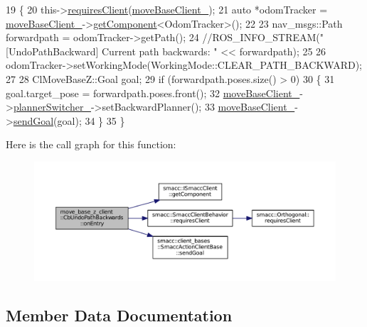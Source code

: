 \begin{DoxyCode}
19   \{
20     this->\hyperlink{classsmacc_1_1SmaccClientBehavior_a917f001e763a1059af337bf4e164f542}{requiresClient}(\hyperlink{classmove__base__z__client_1_1CbUndoPathBackwards_a19e7ace85698725a1d2730a7c6b3aa7d}{moveBaseClient\_});
21     \textcolor{keyword}{auto} *odomTracker = \hyperlink{classmove__base__z__client_1_1CbUndoPathBackwards_a19e7ace85698725a1d2730a7c6b3aa7d}{moveBaseClient\_}->\hyperlink{classsmacc_1_1ISmaccClient_adef78db601749ca63c19e74a27cb88cc}{getComponent}<OdomTracker>();
22 
23     nav\_msgs::Path forwardpath = odomTracker->getPath();
24     \textcolor{comment}{//ROS\_INFO\_STREAM("[UndoPathBackward] Current path backwards: " << forwardpath);}
25 
26     odomTracker->setWorkingMode(WorkingMode::CLEAR\_PATH\_BACKWARD);
27 
28     ClMoveBaseZ::Goal goal;
29     \textcolor{keywordflow}{if} (forwardpath.poses.size() > 0)
30     \{
31       goal.target\_pose = forwardpath.poses.front();
32       \hyperlink{classmove__base__z__client_1_1CbUndoPathBackwards_a19e7ace85698725a1d2730a7c6b3aa7d}{moveBaseClient\_}->\hyperlink{classmove__base__z__client_1_1ClMoveBaseZ_ac57d2293bc0a5c4fcef326379822cc5e}{plannerSwitcher\_}->setBackwardPlanner();
33       \hyperlink{classmove__base__z__client_1_1CbUndoPathBackwards_a19e7ace85698725a1d2730a7c6b3aa7d}{moveBaseClient\_}->\hyperlink{classsmacc_1_1client__bases_1_1SmaccActionClientBase_a9c47a5094ac8afb01680307fe5eca922}{sendGoal}(goal);
34     \}
35   \}
\end{DoxyCode}


Here is the call graph for this function\+:
\nopagebreak
\begin{figure}[H]
\begin{center}
\leavevmode
\includegraphics[width=350pt]{classmove__base__z__client_1_1CbUndoPathBackwards_a171b0d1a2943f5aca0647b101695eb71_cgraph}
\end{center}
\end{figure}




\subsection{Member Data Documentation}
